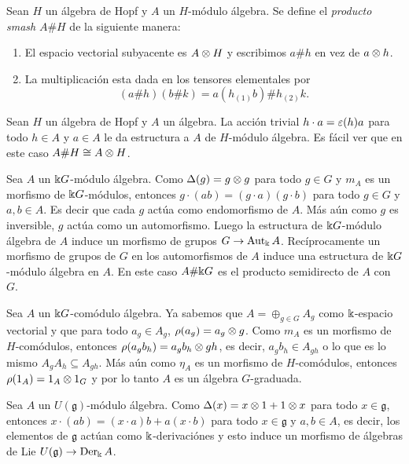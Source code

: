 \documentclass[a4paper,oneside,fleqn,11pt,../tesis.tex]{subfiles}
\begin{document}
\begin{definition}
	Sean $H$ un álgebra de Hopf y $A$ un $H$-módulo álgebra.
	Se define el \emph{producto smash} $A\#H$ de la siguiente manera:
	\begin{enumerate}[(1)]
		\item El espacio vectorial subyacente es $A \otimes H$ y escribimos $a\#h$ en vez de $a\otimes h$.
		\item La multiplicación esta dada en los tensores elementales por
		\[
			(a\#h)(b\#k) = a(h_{(1)}b)\#h_{(2)}k.
		\]
	\end{enumerate}
\end{definition}

\begin{example}
	Sean $H$ un álgebra de Hopf y $A$ un álgebra. La acción trivial $h \cdot a = \varepsilon(h) a$ para todo $h \in A$
	y $a \in A$ le da estructura a $A$ de $H$-módulo álgebra. Es fácil ver que en este caso $A\#H \cong A\otimes H$.
\end{example}

\begin{example}
	Sea $A$ un $\Bbbk G$-módulo álgebra. Como $\Delta(g) = g \otimes g$ para todo $g \in G$ y $m_A$ es un morfismo de $\Bbbk G$-módulos,
	entonces $g \cdot (ab) = (g \cdot a)(g \cdot b)$ para todo $g \in G$ y $a,b \in A$.
	Es decir que cada $g$ actúa como endomorfismo de $A$. Más aún como
	$g$ es inversible, $g$ actúa como un automorfismo. Luego la estructura de $\Bbbk G$-módulo álgebra de $A$ induce
	un morfismo de grupos $G \to \operatorname{Aut}_{\Bbbk}A$. Recíprocamente un morfismo de grupos de $G$ en los automorfismos
	de $A$ induce una estructura de $\Bbbk G$-módulo álgebra en $A$. En este caso $A \# \Bbbk G$ es el producto semidirecto
	de $A$ con $G$.
\end{example}

\begin{example}
	Sea $A$ un $\Bbbk G$-comódulo álgebra. Ya sabemos que $A = \oplus_{g \in G} A_g$ como $\Bbbk$-espacio vectorial
	y que para todo $a_g \in A_g$, $\rho(a_g) = a_g \otimes g$. Como $m_A$ es un morfismo de $H$-comódulos, entonces
	$\rho(a_g b_h) = a_g b_h \otimes gh$, es decir, $a_g b_h \in A_{gh}$ o lo que es lo mismo $A_g A_h \subseteq A_{gh}$.
	Más aún como $\eta_A$ es un morfismo de $H$-comódulos, entonces $\rho(1_A) = 1_A \otimes 1_G$ y por lo tanto
	$A$ es un álgebra $G$-graduada. 
\end{example}

\begin{example}
	Sea $A$ un $U(\mathfrak{g})$-módulo álgebra. Como $\Delta(x) = x \otimes 1 + 1 \otimes x$ para todo $x \in \mathfrak{g}$,
	entonces $x\cdot (ab) = (x \cdot a)b + a (x \cdot b)$ para todo $x\in \mathfrak{g}$ y $a, b \in A$, es decir,
	los elementos de $\mathfrak{g}$ actúan como $\Bbbk$-derivaciónes y esto
	induce un morfismo de álgebras de Lie $U(\mathfrak{g}) \to \operatorname{Der}_{\Bbbk}A$.
\end{example}
\end{document}
